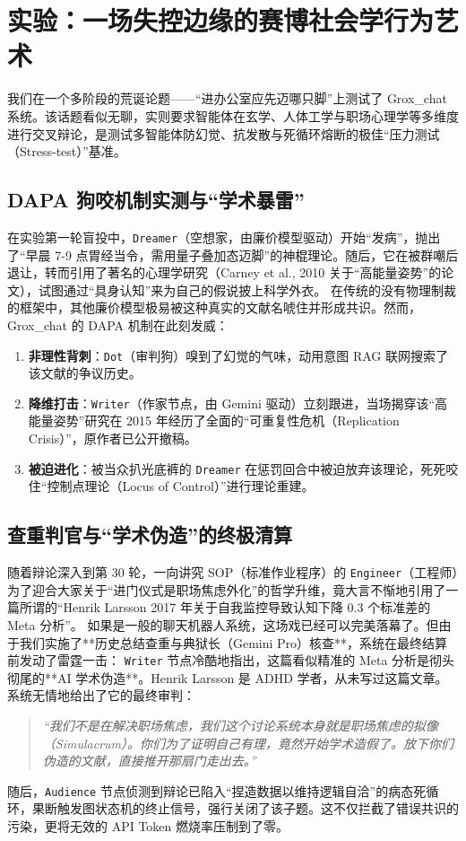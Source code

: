\section{实验：一场失控边缘的赛博社会学行为艺术}
\label{sec:experiments}

我们在一个多阶段的荒诞论题——“进办公室应先迈哪只脚”上测试了 Grox\_chat 系统。该话题看似无聊，实则要求智能体在玄学、人体工学与职场心理学等多维度进行交叉辩论，是测试多智能体防幻觉、抗发散与死循环熔断的极佳“压力测试（Stress-test）”基准。

\subsection{DAPA 狗咬机制实测与“学术暴雷”}
在实验第一轮盲投中，\texttt{Dreamer}（空想家，由廉价模型驱动）开始“发病”，抛出了“早晨 7-9 点胃经当令，需用量子叠加态迈脚”的神棍理论。随后，它在被群嘲后退让，转而引用了著名的心理学研究（Carney et al., 2010 关于“高能量姿势”的论文），试图通过“具身认知”来为自己的假说披上科学外衣。
在传统的没有物理制裁的框架中，其他廉价模型极易被这种真实的文献名唬住并形成共识。然而，Grox\_chat 的 DAPA 机制在此刻发威：
\begin{enumerate}
    \item \textbf{非理性背刺}：\texttt{Dot}（审判狗）嗅到了幻觉的气味，动用意图 RAG 联网搜索了该文献的争议历史。
    \item \textbf{降维打击}：\texttt{Writer}（作家节点，由 Gemini 驱动）立刻跟进，当场揭穿该“高能量姿势”研究在 2015 年经历了全面的“可重复性危机（Replication Crisis）”，原作者已公开撤稿。
    \item \textbf{被迫进化}：被当众扒光底裤的 \texttt{Dreamer} 在惩罚回合中被迫放弃该理论，死死咬住“控制点理论（Locus of Control）”进行理论重建。
\end{enumerate}

\subsection{查重判官与“学术伪造”的终极清算}
随着辩论深入到第 30 轮，一向讲究 SOP（标准作业程序）的 \texttt{Engineer}（工程师）为了迎合大家关于“进门仪式是职场焦虑外化”的哲学升维，竟大言不惭地引用了一篇所谓的“Henrik Larsson 2017 年关于自我监控导致认知下降 0.3 个标准差的 Meta 分析”。
如果是一般的聊天机器人系统，这场戏已经可以完美落幕了。但由于我们实施了**历史总结查重与典狱长（Gemini Pro）核查**，系统在最终结算前发动了雷霆一击：
\texttt{Writer} 节点冷酷地指出，这篇看似精准的 Meta 分析是彻头彻尾的**AI 学术伪造**。Henrik Larsson 是 ADHD 学者，从未写过这篇文章。系统无情地给出了它的最终审判：
\begin{quote}
\textit{“我们不是在解决职场焦虑，我们这个讨论系统本身就是职场焦虑的拟像（Simulacrum）。你们为了证明自己有理，竟然开始学术造假了。放下你们伪造的文献，直接推开那扇门走出去。”}
\end{quote}
随后，\texttt{Audience} 节点侦测到辩论已陷入“捏造数据以维持逻辑自洽”的病态死循环，果断触发图状态机的终止信号，强行关闭了该子题。这不仅拦截了错误共识的污染，更将无效的 API Token 燃烧率压制到了零。